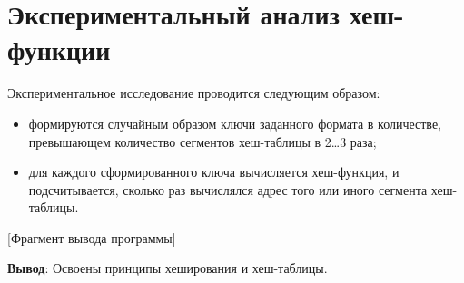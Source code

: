 \documentclass{bsuir}
\begin{document}
\section*{Экспериментальный анализ хеш-функции}

Экспериментальное исследование проводится следующим образом:

\begin{itemize}
    \item формируются случайным образом ключи заданного формата в количестве,
          превышающем количество сегментов хеш-таблицы в 2\ldots 3 раза;
    \item для каждого сформированного ключа вычисляется хеш-функция, и
          подсчитывается, сколько раз вычислялся адрес того или иного сегмента
          хеш-таблицы.
\end{itemize}


[Фрагмент вывода программы]

\textbf{Вывод}: Освоены принципы хеширования и хеш-таблицы.
\end{document}
